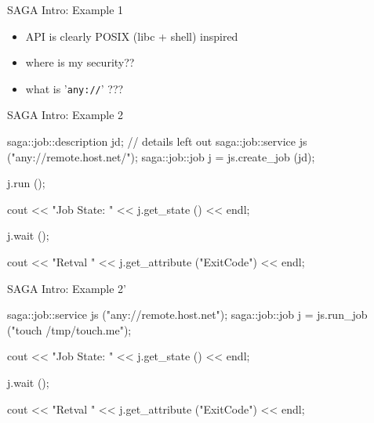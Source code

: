\documentclass[%
  pdf,
  colorBG,
  slideColor,
  frames,
  ogf
]{prosper}
\newcommand{\T}[1]{\texttt{#1}}
\newcommand{\dn}{\vspace*{+1em}}
\begin{document}

 \begin{slide}{SAGA Intro: Example 1}

  \dn\dn
  
  \begin{itemize}
   \item API is clearly POSIX (libc + shell) inspired
   \item where is my security??
   \item what is '\T{any://}' ???
  \end{itemize}

 \end{slide}



 \begin{slide}{SAGA Intro: Example 2}

  \begin{mycode}[label=SAGA: Job Submission]

  saga::job::description jd; // details left out 
  saga::job::service     js ("any://remote.host.net/");
  saga::job::job         j = js.create_job (jd);

  j.run ();

  cout << "Job State: " << j.get_state () << endl;

  j.wait ();

  cout << "Retval " << j.get_attribute ("ExitCode") << endl;

  \end{mycode}
   
 \end{slide}



 \begin{slide}{SAGA Intro: Example 2'}

  \begin{mycode}[label=SAGA: Job Submission]


  saga::job::service     js ("any://remote.host.net");
  saga::job::job         j = js.run_job ("touch /tmp/touch.me");



  cout << "Job State: " << j.get_state () << endl;

  j.wait ();

  cout << "Retval " << j.get_attribute ("ExitCode") << endl;

  \end{mycode}
   
 \end{slide}
\end{document}
